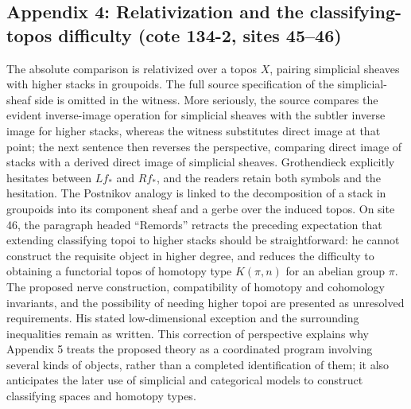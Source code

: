 \subsection*{Appendix 4: Relativization and the classifying-topos difficulty (cote 134-2, sites 45--46)}
The absolute comparison is relativized over a topos $X$, pairing simplicial sheaves with higher stacks in groupoids. The full source specification of the simplicial-sheaf side is omitted in the witness. More seriously, the source compares the evident inverse-image operation for simplicial sheaves with the subtler inverse image for higher stacks, whereas the witness substitutes direct image at that point; the next sentence then reverses the perspective, comparing direct image of stacks with a derived direct image of simplicial sheaves. Grothendieck explicitly hesitates between $Lf_*$ and $Rf_*$, and the readers retain both symbols and the hesitation. The Postnikov analogy is linked to the decomposition of a stack in groupoids into its component sheaf and a gerbe over the induced topos. On site 46, the paragraph headed ``Remords'' retracts the preceding expectation that extending classifying topoi to higher stacks should be straightforward: he cannot construct the requisite object in higher degree, and reduces the difficulty to obtaining a functorial topos of homotopy type $K(\pi,n)$ for an abelian group $\pi$. The proposed nerve construction, compatibility of homotopy and cohomology invariants, and the possibility of needing higher topoi are presented as unresolved requirements. His stated low-dimensional exception and the surrounding inequalities remain as written. This correction of perspective explains why Appendix 5 treats the proposed theory as a coordinated program involving several kinds of objects, rather than a completed identification of them; it also anticipates the later use of simplicial and categorical models to construct classifying spaces and homotopy types.


